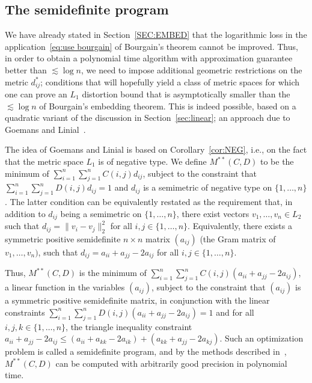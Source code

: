 \documentclass{icm2010}
\theoremstyle{definition}
\newcommand{\1}{\mathbf{1}}
\renewcommand{\le}{\leqslant}
\begin{document}
\subsection{The semidefinite program}\label{sec:semidefinite}

We have already stated in Section~\ref{SEC:EMBED} that the
logarithmic loss in the application~\eqref{eq:use bourgain} of
Bourgain's theorem cannot be improved. Thus, in order to obtain a
polynomial time algorithm with  approximation guarantee better than
$\lesssim \log n$, we need to impose additional geometric
restrictions on the metric $d_{ij}^*$; conditions that will
hopefully yield a class of metric spaces for which one can prove an
$L_1$ distortion bound that is asymptotically smaller than the
$\lesssim \log n$ of Bourgain's embedding theorem. This is indeed
possible, based on a quadratic variant of the discussion in
Section~\ref{sec:linear}; an approach due to Goemans and
Linial~\cite{Goe97,Lin-open,Lin02}.

The idea of Goemans and Linial is based on Corollary~\ref{cor:NEG},
i.e., on the fact that the metric space $L_1$ is of negative type.
We define $M^{**}(C,D)$ to be the minimum of
$\sum_{i=1}^n\sum_{j=1}^n C(i,j)d_{ij}$, subject to the constraint
that $\sum_{i=1}^n\sum_{j=1}^n D(i,j)d_{ij}=1$ and $d_{ij}$ is a
semimetric of negative type on $\{1,\ldots,n\}$. The latter
condition can be equivalently restated as the requirement that, in
addition to $d_{ij}$ being a semimetric on $\{1,\ldots,n\}$, there
exist vectors $v_1,\ldots,v_n\in L_2$ such that
$d_{ij}=\|v_i-v_j\|_2^2$ for all $i,j\in \{1,\ldots,n\}$.
Equivalently, there exists a symmetric positive semidefinite
$n\times n$ matrix $(a_{ij})$ (the Gram matrix of $v_1,\ldots,v_n)$,
such that $d_{ij}=a_{ii}+a_{jj}-2a_{ij}$ for all $i,j\in
\{1,\ldots,n\}$.

Thus, $M^{**}(C,D)$ is the minimum of $\sum_{i=1}^n\sum_{j=1}^n
C(i,j)(a_{ii}+a_{jj}-2a_{ij})$, a linear function in the variables
$(a_{ij})$, subject to the constraint that $(a_{ij})$ is a symmetric
positive semidefinite matrix, in conjunction with the linear
constraints $\sum_{i=1}^n\sum_{j=1}^n
D(i,j)(a_{ii}+a_{jj}-2a_{ij})=1$ and  for all $i,j,k\in
\{1,\ldots,n\}$, the triangle inequality constraint
$a_{ii}+a_{jj}-2a_{ij}\le
(a_{ii}+a_{kk}-2a_{ik})+(a_{kk}+a_{jj}-2a_{kj})$. Such an
optimization problem is called a semidefinite program, and by the
methods described in~\cite{GLS93}, $M^{**}(C,D)$ can be computed
with arbitrarily good precision in polynomial time.
\end{document}
